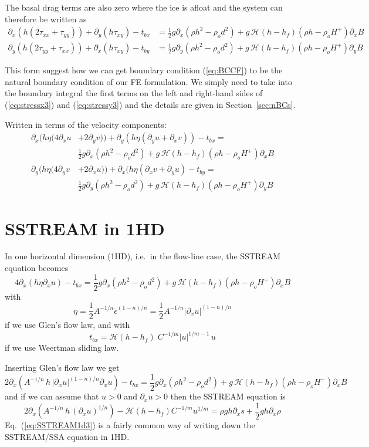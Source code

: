 \documentclass[10pt,a4paper]{book}
\newcommand{\He}{\mathcal{H}}
\newcommand{\p}{\partial}
\newcommand{\tbx}{t_{bx}}
\newcommand{\tby}{t_{by}}
\newcommand{\txx}{\tau_{xx}}
\newcommand{\tyy}{\tau_{yy}}
\newcommand{\txy}{\tau_{xy}}
\begin{document}
The basal drag terms are also zero where the ice is afloat and the
system can therefore be written as
\begin{align} 
\p_x ( h ( 2 \txx + \tyy)) +\p_y ( h \txy) -  \tbx
&=\frac{1}{2} g \p_x (\rho h^2 - \rho_o d^2)+ g\,\He(h-h_f) (\rho h -\rho_o H^{+}) \p_x B 
\label{eq:stressx3}\\
\p_y (  h ( 2 \tyy + \txx)) +\p_x ( h \txy ) - \tby
&=\frac{1}{2} g \p_y (\rho h^2 - \rho_o d^2)+g\,\He(h-h_f) (\rho h -\rho_o H^{+}) \p_y B
\label{eq:stressy3}
\end{align}

This form suggest how we can get boundary condition (\ref{eq:BCCF}) to
be the natural boundary condition of our FE formulation. We simply
need to take into the boundary integral the first terms on the left
and right-hand sides of (\ref{eq:stressx3}) and (\ref{eq:stressy3}) and
the details are given in Section~\ref{sec:nBCs}.


Written in terms of the velocity components: 
\begin{align} 
\p_x ( h \eta ( 4 \p_x u &+ 2 \p_y v)) + \p_y ( h \eta (\p_y u + \p_x v) ) - \tbx = \nonumber \\
& \frac{1}{2} g \p_x (\rho h^2 - \rho_o d^2)+ g\,\He(h-h_f) (\rho h -\rho_o H^{+}) \p_x B 
\label{eq:vel3x}\\
\p_y (  h \eta ( 4 \p_y v &+ 2 \p_x u )) +\p_x ( h \eta (\p_x v + \p_y u ) -  \tby = \nonumber \\
& \frac{1}{2} g \p_y (\rho h^2 - \rho_o d^2)+g\,\He(h-h_f) (\rho h -\rho_o H^{+}) \p_y B
\label{eq:vel3y}
\end{align}

\section{SSTREAM in 1HD}

In one horizontal dimension (1HD), i.e.\ in the flow-line case, the SSTREAM equation becomes
\[
 4 \p_x ( h \eta   \p_x u ) - \tbx = \frac{1}{2} g \p_x (\rho h^2 - \rho_o d^2)+ g\,\He(h-h_f) (\rho h -\rho_o H^{+}) \p_x B 
\]
with
\[
\eta = \frac{1}{2} A^{-1/n} \dot{\epsilon}^{(1-n)/n} =  \frac{1}{2} A^{-1/n} |\p_x u|^{(1-n)/n} 
\]
if we use Glen's flow law, 
and with 
\[
t_{bx}   = \He(h-h_f) \; C^{-1/m} | u |^{1/m-1} \, u 
\]
if we use Weertman sliding law.

Inserting Glen's flow law we get
\begin{equation}
 2 \p_x ( A^{-1/n} \, h \, | \p_x u|^{(1-n)/n}   \p_x u ) - \tbx = \frac{1}{2} g \p_x (\rho h^2 - \rho_o d^2)+ g\,\He(h-h_f) (\rho h -\rho_o H^{+}) \p_x B 
\label{eq:SSTREAM1D}
\end{equation}
and if we can assume that $u>0$ and $\p_x u>0$  then the SSTREAM equation is
\begin{equation}
2 \p_x \left ( A^{-1/n} \, h \, (\p_x u)^{1/n}   \right ) - \He(h-h_f) C^{-1/m} u^{1/m} = \rho g h \p_x s + \frac{1}{2} g h \p_x \rho 
\label{eq:SSTREAM1d3}
\end{equation}
Eq.~(\ref{eq:SSTREAM1d3}) is a fairly common way of writing down the SSTREAM/SSA equation in 1HD.
\end{document}
